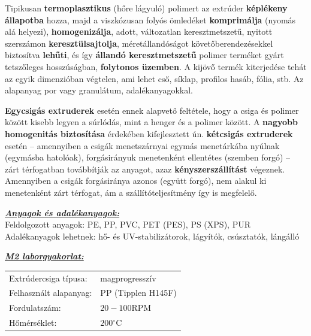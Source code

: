 \documentclass[12pt,a4paper]{article}       %
\newcounter{questionctr}
\newenvironment{question}[1]{
  \refstepcounter{questionctr}
  \begin{tcolorbox}[
    colback=gray!25,
    colbacktitle=red!10!yellow!50,
    enhanced,
    sharp corners,
    boxrule=0mm,
    frame hidden,
    breakable,
    enhanced jigsaw,
    title={\textcolor{black}{\textsc{\# \thequestionctr{} – #1}}}
  ]


}{\end{tcolorbox}}
\begin{document}
\begin{question}{
    Mi az extrúzió? (vázlat, felhasználása, előnyök-hátrányok, jellemző
    anyagok). Jellemzően mire használjuk az egy-, illetve kétcsigás
    extrudereket?
  }
  Tipikusan \textbf{termoplasztikus} (hőre lágyuló) polimert az extrúder
  \textbf{képlékeny állapotba} hozza, majd a viszkózusan folyós ömledéket
  \textbf{komprimálja} (nyomás alá helyezi), \textbf{homogenizálja}, adott,
  változatlan keresztmetszetű, nyitott szerszámon \textbf{keresztülsajtolja},
  méretállandóságot követőberendezésekkel biztosítva \textbf{lehűti}, és így
  \textbf{állandó keresztmetszetű} polimer terméket gyárt tetszőleges
  hosszúságban, \textbf{folytonos üzemben}. A kijövő termék kiterjedése tehát
  az egyik dimenzióban végtelen, ami lehet cső, síklap, profilos hasáb, fólia,
  stb. Az alapanyag por vagy granulátum, adalékanyagokkal.
  \tcbline

  \textbf{Egycsigás extruderek} esetén ennek alapvető feltétele, hogy a csiga
  és polimer között kisebb legyen a súrlódás, mint a henger és a polimer
  között. A \textbf{nagyobb homogenitás biztosítása} érdekében kifejlesztett
  ún. \textbf{kétcsigás extruderek} esetén – amennyiben a csigák menetszárnyai
  egymás menetárkába nyúlnak (egymásba hatolóak), forgásirányuk menetenként
  ellentétes (szemben forgó) – zárt térfogatban továbbítják az anyagot, azaz
  \textbf{kényszerszállítást} végeznek. Amennyiben a csigák forgásiránya azonos
  (együtt forgó), nem alakul ki menetenként zárt térfogat, ám a
  szállítóteljesítmény így is megfelelő.
  \tcbline

  \underline{\textbf{\textit{Anyagok és adalékanyagok:}}} \\[2mm]
  Feldolgozott anyagok: PE, PP, PVC, PET (PES), PS (XPS), PUR \\[2mm]
  Adalékanyagok lehetnek: hő- és UV-stabilizátorok, lágyítók, csúsztatók,
  lángálló
  \tcbline

  \underline{\textbf{\textit{M2 laborgyakorlat:}}}
  \begin{table}[H]
    \centering\begin{tabular}{l l}
      Extrúdercsiga típusa:  & magprogresszív        \\
      Felhasznált alapanyag: & PP (Tipplen H145F)    \\
      Fordulatszám:          & $20-100 \mathrm{RPM}$ \\
      Hőmérséklet:           & $200^\circ\mathrm{C}$
    \end{tabular}
  \end{table}
\end{question}
\end{document}
